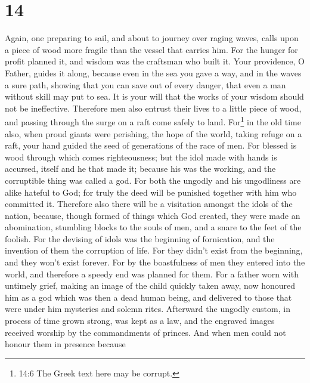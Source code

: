 \hypertarget{section-13}{%
\section{14}\label{section-13}}

 Again, one preparing to sail, and about to journey over
raging waves, calls upon a piece of wood more fragile than the vessel
that carries him.  For the hunger for profit planned it, and
wisdom was the craftsman who built it.  Your providence, O
Father, guides it along, because even in the sea you gave a way, and in
the waves a sure path,  showing that you can save out of
every danger, that even a man without skill may put to sea. 
It is your will that the works of your wisdom should not be ineffective.
Therefore men also entrust their lives to a little piece of wood, and
passing through the surge on a raft come safely to land. 
For\footnote{14:6 The Greek text here may be corrupt.} in the old time
also, when proud giants were perishing, the hope of the world, taking
refuge on a raft, your hand guided the seed of generations of the race
of men.  For blessed is wood through which comes
righteousness;  but the idol made with hands is accursed,
itself and he that made it; because his was the working, and the
corruptible thing was called a god.  For both the ungodly
and his ungodliness are alike hateful to God;  for truly
the deed will be punished together with him who committed it.
 Therefore also there will be a visitation amongst the
idols of the nation, because, though formed of things which God created,
they were made an abomination, stumbling blocks to the souls of men, and
a snare to the feet of the foolish.  For the devising of
idols was the beginning of fornication, and the invention of them the
corruption of life.  For they didn't exist from the
beginning, and they won't exist forever.  For by the
boastfulness of men they entered into the world, and therefore a speedy
end was planned for them.  For a father worn with untimely
grief, making an image of the child quickly taken away, now honoured him
as a god which was then a dead human being, and delivered to those that
were under him mysteries and solemn rites.  Afterward the
ungodly custom, in process of time grown strong, was kept as a law, and
the engraved images received worship by the commandments of princes.
 And when men could not honour them in presence because
